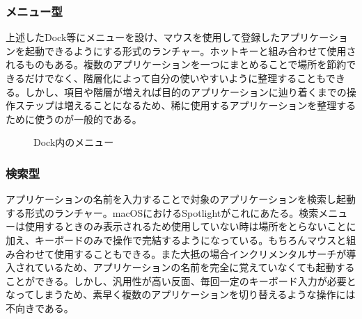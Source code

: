 \subsubsection{メニュー型}

上述したDock等にメニューを設け、マウスを使用して登録したアプリケーションを起動できるようにする形式のランチャー。ホットキーと組み合わせて使用されるものもある。複数のアプリケーションを一つにまとめることで場所を節約できるだけでなく、階層化によって自分の使いやすいように整理することもできる。しかし、項目や階層が増えれば目的のアプリケーションに辿り着くまでの操作ステップは増えることになるため、稀に使用するアプリケーションを整理するために使うのが一般的である。

\newpage

\begin{figure}[h]
    \begin{center}
    \end{center}
    \caption{Dock内のメニュー}
    \label{fig:menu}
\end{figure}

\subsubsection{検索型}

アプリケーションの名前を入力することで対象のアプリケーションを検索し起動する形式のランチャー。macOSにおけるSpotlightがこれにあたる。検索メニューは使用するときのみ表示されるため使用していない時は場所をとらないことに加え、キーボードのみで操作で完結するようになっている。もちろんマウスと組み合わせて使用することもできる。また大抵の場合インクリメンタルサーチが導入されているため、アプリケーションの名前を完全に覚えていなくても起動することができる。しかし、汎用性が高い反面、毎回一定のキーボード入力が必要となってしまうため、素早く複数のアプリケーションを切り替えるような操作には不向きである。

